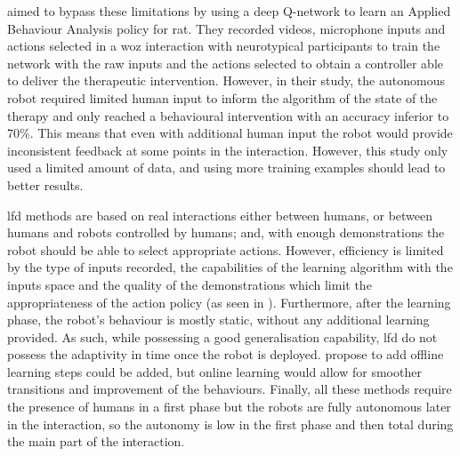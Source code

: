     \cite{clark2018deep} aimed to bypass these limitations by using a deep Q-network \citep{mnih2015human} to learn an Applied Behaviour Analysis policy for \gls{rat}. They recorded videos, microphone inputs and actions selected in a \gls{woz} interaction with neurotypical participants to train the network with the raw inputs and the actions selected to obtain a controller able to deliver the therapeutic intervention. However, in their study, the autonomous robot required limited human input to inform the algorithm of the state of the therapy and only reached a behavioural intervention with an accuracy inferior to 70\%. This means that even with additional human input the robot would provide inconsistent feedback at some points in the interaction. However, this study only used a limited amount of data, and using more training examples should lead to better results.
     
    \gls{lfd} methods are based on real interactions either between humans, or between humans and robots controlled by humans; and, with enough demonstrations the robot should be able to select appropriate actions. However, efficiency is limited by the type of inputs recorded, the capabilities of the learning algorithm with the inputs space and the quality of the demonstrations which limit the appropriateness of the action policy (as seen in \citealt{clark2018deep}). Furthermore, after the learning phase, the robot's behaviour is  mostly static, without any additional learning provided. As such, while possessing a good generalisation capability, \gls{lfd} do not possess the adaptivity in time once the robot is deployed. \cite{sequeira2016discovering} propose to add offline learning steps could be added, but online learning would allow for smoother transitions and improvement of the behaviours.
    Finally, all these methods require the presence of humans in a first phase but the robots are fully autonomous later in the interaction, so the autonomy is low in the first phase and then total during the main part of the interaction.
    
